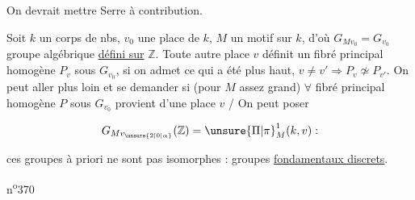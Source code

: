 
On devrait mettre Serre à contribution.


Soit $k$ un corps de nbs, $v_0$ une place de $k$, $M$ un motif sur $k$, d'où $G_{M v_0}=G_{v_0}$ groupe algébrique \uline{défini sur} $\mathbb{Z}$. Toute autre place  $v$ définit un fibré principal homogène $P_v$ sous $G_{v_0}$,  si on admet ce qui a été   plus haut,  $v\ne v'\Longrightarrow P_v\not\simeq P_{v'}$. On peut aller plus loin et se demander si  (pour $M$ assez grand) \uline{$\forall$} fibré principal homogène $P$ sous $G_{v_0}$ provient d'une place $v$  /  On  peut poser


\[
G_{Mv_{\unsure{2|0|\alpha}}}(\mathbb{Z})=\unsure{\Pi|\pi}^{1}_{M}(k,v) :
\]

ces groupes à priori ne sont pas isomorphes : groupes \uline{fondamentaux  discrets}.

 \hfill n\textsuperscript{o}370

